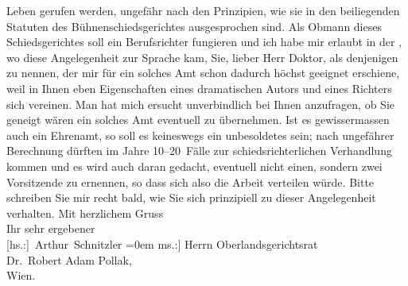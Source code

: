 \begin{ledgroupsized}[t]{13cm}
                    Leben gerufen werden, ungefähr nach den Prinzipien, wie sie in den beiliegenden
                    Statuten des Bühnenschiedsgerichtes ausgesprochen sind. Als Obmann dieses
                    Schiedsgerichtes soll ein Berufsrichter fungieren und ich habe mir erlaubt in
                    der \label{K_L02356_1v}\label{K_L02356_1h},
                    wo diese Angelegenheit zur Sprache kam, Sie, lieber Herr Doktor, als denjenigen
                    zu nennen, der mir für ein solches Amt schon dadurch höchst geeignet erschiene,
                    weil in Ihnen eben Eigenschaften eines dramatischen Autors und eines Richters
                    sich vereinen. Man hat mich ersucht unverbindlich bei Ihnen anzufragen, ob Sie
                    geneigt wären ein solches Amt eventuell zu übernehmen. Ist es gewissermassen
                    auch ein Ehrenamt, so soll es keineswegs ein unbesoldetes sein; nach ungefährer
                    Berechnung dürften im Jahre 10–20 Fälle zur schiedsrichterlichen Verhandlung
                    kommen und es wird auch daran gedacht, eventuell nicht einen, sondern zwei
                    Vorsitzende zu ernennen, so dass sich also die Arbeit verteilen würde. Bitte
                    schreiben Sie mir recht bald, wie Sie sich prinzipiell zu dieser Angelegenheit
                    verhalten.\pend
           \pstart
           Mit herzlichem Gruss{\\[\baselineskip]}Ihr sehr ergebener{\\[\baselineskip]}\spacefill\mbox{{[}hs.:{]} Arthur Schnitzler}\pend
           \leftskip=0em{}\pstart
           \noindent{}{[}ms.:{]} Herrn Oberlandsgerichtsrat{\\}Dr. Robert
                        Adam Pollak,{\\}Wien.\pend
                     \endnumbering{}\end{ledgroupsized}  \newcommand{\dateiname}{L02356}\newcommand{\titel}{Arthur Schnitzler an Robert Adam, 28. 10. 1920}\newcommand{\editorInnen}{Martin Anton Müller und Gerd-Hermann Susen}
            \footnotesize
\begin{ledgroupsized}[t]{11.5cm}
\end{ledgroupsized}
         
      